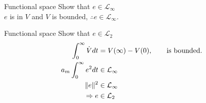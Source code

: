 \begin{example}{Functional space}
Show that $e \in \mathcal{L}_\infty$ \\
  $e$ is in $V$ and $V$ is bounded, $\therefore e \in \mathcal{L}_\infty$.
\end{example}

\begin{example}{Functional space}
Show that $e \in \mathcal{L}_2$ 
  \begin{alignat*}{3}
      \int_0^\infty \dot{V} dt &= V(\infty) - V(0), \qquad \textnormal{is bounded}.\\
      a_m \int_0^\infty e^2 dt &\in \mathcal{L}_\infty\\
      \| e \|^2 &\in \mathcal{L}_\infty\\
      \Rightarrow e &\in \mathcal{L}_2
  \end{alignat*}
\end{example}

